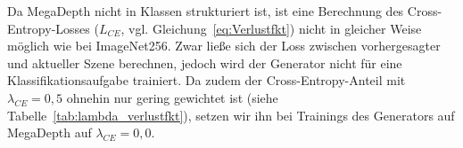 {Da MegaDepth nicht in Klassen strukturiert ist, ist eine Berechnung des Cross-Entropy-Losses ($L_{CE}$, vgl. Gleichung~\ref{eq:Verlustfkt}) nicht in gleicher Weise möglich wie bei ImageNet256. 
Zwar ließe sich der Loss zwischen vorhergesagter und aktueller Szene berechnen, jedoch wird der Generator nicht für eine Klassifikationsaufgabe trainiert. 
Da zudem der Cross-Entropy-Anteil mit $\lambda_{CE} = 0,5$ ohnehin nur gering gewichtet ist (siehe Tabelle~\ref{tab:lambda_verlustfkt}), setzen wir ihn bei Trainings des Generators auf MegaDepth auf $\lambda_{CE} = 0,0$.  








%     








}
